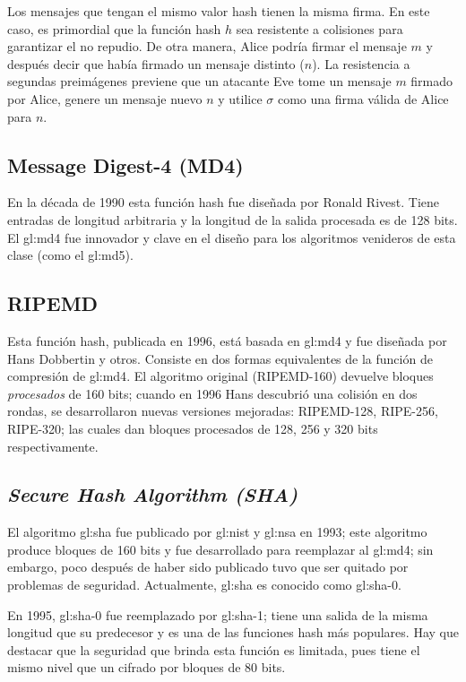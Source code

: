 Los mensajes que tengan el mismo valor hash tienen la misma firma. En
este caso, es primordial que la función hash $h$ sea resistente a
colisiones para garantizar el no repudio. De otra manera, Alice podría
firmar el mensaje $m$ y después decir que había firmado un mensaje
distinto ($n$).
La resistencia a segundas preimágenes previene que un atacante Eve tome
un mensaje $m$ firmado por Alice, genere un mensaje nuevo $n$ y utilice
$\sigma$ como una firma válida de Alice para $n$.

\subsection{Message Digest-4 (MD4)}

En la década de 1990 esta función hash fue diseñada por Ronald Rivest.
Tiene entradas de longitud arbitraria y la longitud de la salida
procesada es de 128 bits. El \gls{gl:md4} fue innovador y
clave en el diseño para los algoritmos venideros de esta clase (como
el \gls{gl:md5}).

\subsection{RIPEMD}

Esta función hash, publicada en 1996, está basada en \gls{gl:md4} y fue
diseñada por Hans Dobbertin y otros. Consiste en dos formas equivalentes de la
función de compresión de \gls{gl:md4}. El algoritmo original (RIPEMD-160)
devuelve bloques \textit{procesados} de 160 bits; cuando en 1996 Hans
descubrió una colisión en dos rondas, se desarrollaron nuevas versiones
mejoradas: RIPEMD-128, RIPE-256, RIPE-320; las cuales dan bloques procesados de
128, 256 y 320 bits respectivamente.

\subsection{\textit{Secure Hash Algorithm (SHA)}}

El algoritmo \gls{gl:sha} fue publicado por \gls{gl:nist} y
\gls{gl:nsa} en 1993; este algoritmo produce bloques de 160 bits y
fue desarrollado para reemplazar al \gls{gl:md4}; sin embargo, poco
después de haber sido publicado tuvo que ser quitado por problemas de
seguridad. Actualmente, \gls{gl:sha} es conocido como \gls{gl:sha}-0.

En 1995, \gls{gl:sha}-0 fue reemplazado por \gls{gl:sha}-1; tiene
una salida de la misma longitud que su predecesor y es una de las funciones
hash más populares. Hay que destacar que la seguridad que brinda esta función
es limitada, pues tiene el mismo nivel que un cifrado por bloques de 80 bits.


